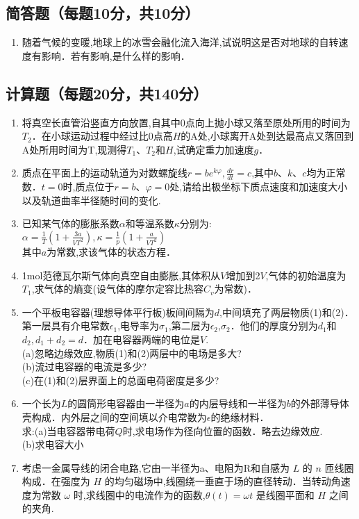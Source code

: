 
\subsection{简答题（每题10分，共10分）}
\begin{enumerate}
\item 随着气候的变暖,地球上的冰雪会融化流入海洋,试说明这是否对地球的自转速度有影响．若有影响,是什么样的影响．
\end{enumerate}
\subsection{计算题（每题20分，共140分）}
\begin{enumerate}
\item 将真空长直管沿竖直方向放置,自其中0点向上抛小球又落至原处所用的时间为$T_2$．在小球运动过程中经过比0点高$H$的$\mathrm A$处,小球离开$\mathrm A$处到达最高点又落回到$\mathrm A$处所用时间为T,现测得$T_1$、$T_2$和$H$,试确定重力加速度$g$．
\item 质点在平面上的运动轨道为对数螺旋线$r=be^{k\varphi},\frac{dr}{dt}=c$,其中$b$、$k$、$c$均为正常数．$t=0$时,质点位于$r=b$、$\varphi=0$处,请给出极坐标下质点速度和加速度大小以及轨道曲率半径随时间的变化.
\item 已知某气体的膨胀系数$\alpha$和等温系数$\kappa$分别为:\\
$\alpha=\frac{1}{T}(1+\frac{3a}{VT^2}),\kappa=\frac{1}{p}(1+\frac{a}{VT^2})$\\
其中$a$为常数,求该气体的状态方程．

\item 1mol范德瓦尔斯气体向真空自由膨胀,其体积从$V$增加到2$V$,气体的初始温度为$T_1$,求气体的熵变(设气体的摩尔定容比热容$C_v$为常数)．
\item 一个平板电容器(理想导体平行板)板间间隔为$d$,中间填充了两层物质(1)和(2)．第一层具有介电常数$\epsilon_1$,电导率为$\sigma_1$,第二层为$\epsilon_2$,$\sigma_2$．他们的厚度分别为$d_1$和$d_2,d_1+d_2=d$．加在电容器两端的电位是$V$.\\
(a)忽略边缘效应,物质(1)和(2)两层中的电场是多大?\\
(b)流过电容器的电流是多少?\\
(c)在(1)和(2)层界面上的总面电荷密度是多少?\\
\item 一个长为$L$的圆筒形电容器由一半径为$a$的内层导线和一半径为$b$的外部薄导体壳构成．内外层之间的空间填以介电常数为$\epsilon$的绝缘材料．\\
求:(a)当电容器带电荷$Q$时,求电场作为径向位置的函数．略去边缘效应.\\
(b)求电容大小
\item 考虑一金属导线的闭合电路,它由一半径为a、电阻为R和自感为 $L$ 的 $n$ 匝线圈构成．在强度为 $H$ 的均匀磁场中,线圈绕一垂直于场的直径转动．当转动角速度为常数 $\omega$ 时,求线圈中的电流作为的函数,$\theta (t)=\omega t$ 是线圈平面和 $H$ 之间的夹角.

\end{enumerate}